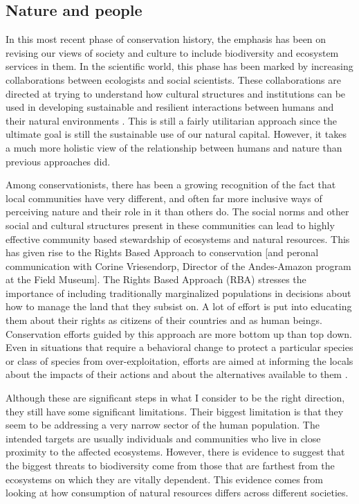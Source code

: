 \documentclass[rutwik_proposal.tex]{subfiles}
\begin{document}
\subsection{Nature and people}

In this most recent phase of conservation history, the emphasis has been on revising our views of society and culture to include biodiversity and ecosystem services in them. In the scientific world, this phase has been marked by increasing collaborations between ecologists and social scientists. These collaborations are directed at trying to understand how cultural structures and institutions can be used in developing sustainable and resilient interactions between humans and their natural environments \cite{Mace14, Ostrom10, Carpenter09}. This is still a fairly utilitarian approach since the ultimate goal is still the sustainable use of our natural capital. However, it takes a much more holistic view of the relationship between humans and nature than previous approaches did.

Among conservationists, there has been a growing recognition of the fact that local communities have very different, and often far more inclusive ways of perceiving nature and their role in it than others do. The social norms and other social and cultural structures present in these communities can lead to highly effective community based stewardship of ecosystems and natural resources. This has given rise to the Rights Based Approach to conservation \cite{Campese09} [and peronal communication with Corine Vriesendorp, Director of the Andes-Amazon program at the Field Museum]. The Rights Based Approach (RBA) stresses the importance of including traditionally marginalized populations in decisions about how to manage the land that they subsist on. A lot of effort is put into educating them about their rights as citizens of their countries and as human beings. Conservation efforts guided by this approach are more bottom up than top down. Even in situations that require a behavioral change to protect a particular species or class of species from over-exploitation, efforts are aimed at informing the locals about the impacts of their actions and about the alternatives available to them \cite{Springer09}.

Although these are significant steps in what I consider to be the right direction, they still have some significant limitations. Their biggest limitation is that they seem to be addressing a very narrow sector of the human population. The intended targets are usually individuals and communities who live in close proximity to the affected ecosystems. However, there is evidence to suggest that the biggest threats to biodiversity come from those that are farthest from the ecosystems on which they are vitally dependent. This evidence comes from looking at how consumption of natural resources differs across different societies.
\end{document}
